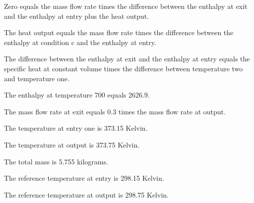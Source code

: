 Zero equals the mass flow rate times the difference between the enthalpy at exit and the enthalpy at entry plus the heat output.

The heat output equals the mass flow rate times the difference between the enthalpy at condition c and the enthalpy at entry.

The difference between the enthalpy at exit and the enthalpy at entry equals the specific heat at constant volume times the difference between temperature two and temperature one.

The enthalpy at temperature 700 equals 2626.9.

The mass flow rate at exit equals 0.3 times the mass flow rate at output.

The temperature at entry one is 373.15 Kelvin.

The temperature at output is 373.75 Kelvin.

The total mass is 5.755 kilograms.

The reference temperature at entry is 298.15 Kelvin.

The reference temperature at output is 298.75 Kelvin.